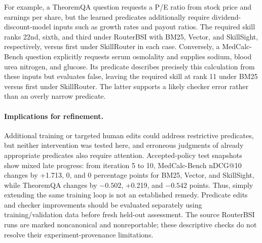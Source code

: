 For example, a TheoremQA question requests a P/E ratio from stock price and earnings per share, but the learned predicates additionally require dividend-discount-model inputs such as growth rates and payout ratios. The required skill ranks 22nd, sixth, and third under RouterBSI with BM25, Vector, and SkillSight, respectively, versus first under SkillRouter in each case. Conversely, a MedCalc-Bench question explicitly requests serum osmolality and supplies sodium, blood urea nitrogen, and glucose. Its predicate describes precisely this calculation from these inputs but evaluates false, leaving the required skill at rank 11 under BM25 versus first under SkillRouter. The latter supports a likely checker error rather than an overly narrow predicate.

\paragraph{Implications for refinement.}
Additional training or targeted human edits could address restrictive predicates, but neither intervention was tested here, and erroneous judgments of already appropriate predicates also require attention. Accepted-policy test snapshots show mixed late progress: from iteration 5 to 10, MedCalc-Bench nDCG@10 changes by +1.713, 0, and 0 percentage points for BM25, Vector, and SkillSight, while TheoremQA changes by $-0.502$, +0.219, and $-0.542$ points. Thus, simply extending the same training loop is not an established remedy. Predicate edits and checker improvements should be evaluated separately using training/validation data before fresh held-out assessment. The source RouterBSI runs are marked noncanonical and nonreportable; these descriptive checks do not resolve their experiment-provenance limitations.
